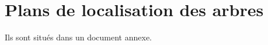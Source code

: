 \documentclass[a4paper]{book}\usepackage[]{graphicx}\usepackage[]{color}
\begin{document}
\section{Plans de localisation des arbres}
Ils sont situés dans un document annexe.
%
%
%
\end{document}

